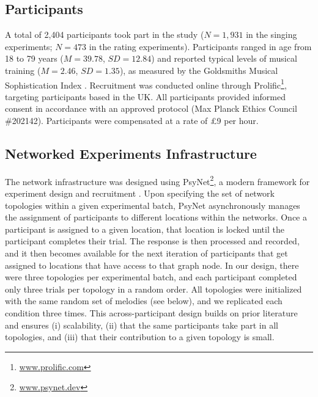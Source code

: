 \documentclass[10pt,letterpaper]{article}
\begin{document}
\subsection{Participants}
A total of 2,404 participants took part in the study ($N=1,931$ in the singing experiments; $N=473$ in the rating experiments). Participants ranged in age from 18 to 79 years ($M = 39.78$, $SD = 12.84$) and reported typical levels of musical training ($M = 2.46$, $SD = 1.35$), as measured by the Goldsmiths Musical Sophistication Index \cite{mullensiefen2013goldsmiths}. Recruitment was conducted online through Prolific\footnote{\url{www.prolific.com}}, targeting participants based in the UK.  
All participants provided informed consent in accordance with an approved protocol (Max Planck Ethics Council \#202142). Participants were compensated at a rate of £9 per hour. 

\subsection{Networked Experiments Infrastructure}
The network infrastructure was designed using PsyNet\footnote{\url{www.psynet.dev}}, a modern framework for experiment design and recruitment \cite{HarrisonMarjieh2020}. Upon specifying the set of network topologies within a given experimental batch, PsyNet asynchronously manages the assignment of participants to different locations within the networks. Once a participant is assigned to a given location, that location is locked until the participant completes their trial. The response is then processed and recorded, and it then becomes available for the next iteration of participants that get assigned to locations that have access to that graph node. In our design, there were three topologies per experimental batch, and each participant completed only three trials per topology in a random order. All topologies were initialized with the same random set of melodies (see below), and we replicated each condition three times. This across-participant design builds on prior literature \cite{anglada2023large} and ensures (i) scalability, (ii) that the same participants take part in all topologies, and (iii) that their contribution to a given topology is small.
\end{document}

